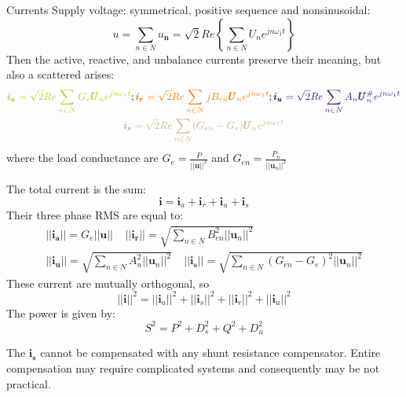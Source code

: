 \documentclass[aspectratio=169]{beamer}
\begin{document}
  \begin{frame}{Currents}{\insertsection}
    Supply voltage: symmetrical, positive sequence and nonsinusoidal:
    \begin{equation}
      \pmb{\mathit{u}} = \sum_{n\in N} \pmb{\mathit{u}_n} = \sqrt{2}Re\left\{\sum_{n\in N}\pmb{\textit{U}}_ne^{jn\omega_1 t}\right\}
    \end{equation}
Then the \textcolor{NTNU_green}{active}, \textcolor{NTNU_orange}{reactive}, and \textcolor{NTNU_purple}{unbalance} currents preserve their meaning, but also a \textcolor{NTNU_sand}{scattered} arises:
    \begin{gather}
      \textcolor{NTNU_green}{\pmb{i_a} = \sqrt{2}Re\sum_{n\in N}G_e\pmb{U}_n e^{jn\omega_{1} t}};
      \textcolor{NTNU_orange}{\pmb{i_r} = \sqrt{2}Re\sum_{n\in N}jB_{en}\pmb{U}_n e^{jn\omega_{1} t}};
      \textcolor{NTNU_purple}{\pmb{i_u} = \sqrt{2}Re\sum_{n\in N}A_{n}\pmb{U}_{n}^{\#} e^{jn\omega_{1} t}}\\
      \textcolor{NTNU_sand}{\pmb{i_s} = \sqrt{2}Re\sum_{n\in N}(G_{en} - G_e)\pmb{U}_n e^{jn\omega_{1} t}}
    \end{gather}
    where the load conductance are $G_e=\frac{P}{||\pmb{u}||^2}$ and $G_{en}=\frac{P_n}{||\pmb{u}_n||^2}$

  \end{frame}

  \begin{frame}
    The total current is the sum:
    \begin{equation}
      \pmb{i} = \pmb{i}_a + \pmb{i}_r + \pmb{i}_u + \pmb{i}_s
    \end{equation}
    Their three phase RMS are equal to:
    \begin{gather}
      ||\pmb{i_a}||=G_e ||\pmb{u}||\ \ \ \ \ 
      ||\pmb{i_r}||=\sqrt{\sum_{n\in N}B_{en}^2||\pmb{u}_n||^2}\\
      ||\pmb{i_u}||=\sqrt{\sum_{n\in N}A_{n}^2||\pmb{u}_n||^2}\ \ \ \ \
      ||\pmb{i_s}||=\sqrt{\sum_{n\in N}(G_{en}-G_e)^2||\pmb{u}_n||^2}
    \end{gather}
    These current are mutually orthogonal, so 
    \begin{equation}
      ||\pmb{i}||^2 = ||\pmb{i}_a||^2 + ||\pmb{i}_s||^2 + ||\pmb{i}_r||^2 + ||\pmb{i}_u||^2
    \end{equation}
    The power is given by:
    \begin{equation}
      S^2 = P^2 + D_s^2 + Q^2 + D_u^2 
    \end{equation}

    The $\pmb{i_s}$ cannot be compensated with any shunt resistance compensator. Entire compensation may require complicated systems and consequently may be not practical.
  \end{frame}
\end{document}
